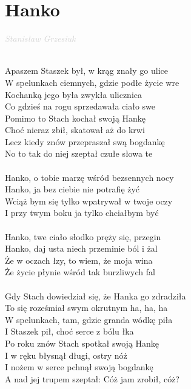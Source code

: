 \documentclass[a5paper, 10pt]{book}
\begin{document}
\section{Hanko}\textcolor{lightgray}{\textit{Stanisław Grzesiuk}}\\~\\
\begin{minipage}[t]{0.8\textwidth}
Apaszem Staszek był, w krąg znały go ulice\\
W spelunkach ciemnych, gdzie podłe życie wre\\
Kochanką jego była zwykła ulicznica\\
Co gdzieś na rogu sprzedawała ciało swe\\
Pomimo to Stach kochał swoją Hankę\\
Choć nieraz zbił, skatował aż do krwi\\
Lecz kiedy znów przepraszał swą bogdankę\\
No to tak do niej szeptał czułe słowa te\\
\\
\hspace*{5mm}Hanko, o tobie marzę wśród bezsennych nocy\\
\hspace*{5mm}Hanko, ja bez ciebie nie potrafię żyć\\
\hspace*{5mm}Wciąż bym się tylko wpatrywał w twoje oczy\\
\hspace*{5mm}I przy twym boku ja tylko chciałbym być\\
\\
\hspace*{5mm}Hanko, twe ciało słodko pręży się, przegin\\
\hspace*{5mm}Hanko, daj usta niech przeminie ból i żal\\
\hspace*{5mm}Że w oczach łzy, to wiem, że moja wina\\
\hspace*{5mm}Że życie płynie wśród tak burzliwych fal\\
\\
Gdy Stach dowiedział się, że Hanka go zdradziła\\
To się roześmiał swym okrutnym ha, ha, ha\\
W spelunkach, tam, gdzie granda wódkę piła\\
I Staszek pił, choć serce z bólu łka\\
Po roku znów Stach spotkał swoją Hankę\\
I w ręku błysnął długi, ostry nóż\\
I nożem w serce pchnął swoją bogdankę\\
A nad jej trupem szeptał: Cóż jam zrobił, cóż?\\
\end{minipage}
\end{document}
